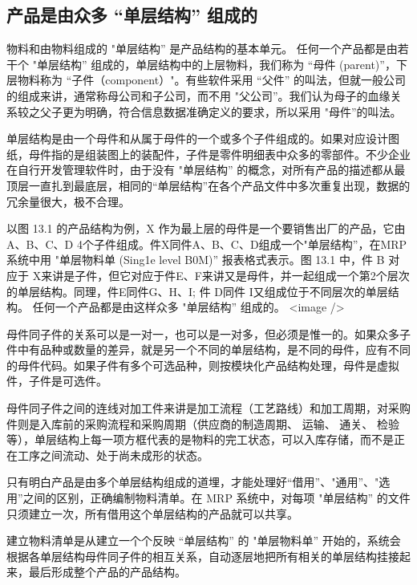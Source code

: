 \subsection {产品是由众多 “单层结构” 组成的}

    物料和由物料组成的 "单层结构” 是产品结构的基本单元。
    任何一个产品都是由若干个 "单层结构” 组成的，单层结构中的上层物料，我们称为 “母件 (parent)”，下层物料称为 “子件（component）"。有些软件采用 “父件” 的叫法，但就一般公司的组成来讲，通常称母公司和子公司，而不用 "父公司”。我们认为母子的血缘关系较之父子更为明确，符合信息数据准确定义的要求，所以采用 "母件”的叫法。

    单层结构是由一个母件和从属于母件的一个或多个子件组成的。如果对应设计图纸，母件指的是组装图上的装配件，子件是零件明细表中众多的零部件。不少企业在自行开发管理软件时，由于没有 "单层结构” 的概念，对所有产品的描述都从最顶层一直扎到最底层，相同的“单层结构”在各个产品文件中多次重复出现，数据的冗余量很大，极不合理。

    以图 13.1 的产品结构为例，X 作为最上层的母件是一个要销售出厂的产品，它由A、B、C、D 4个子件组成。件X同件A、B、C、D组成一个"单层结构”，在MRP系统中用 "单层物料单 (Sing1e level B0M)” 报表格式表示。图 13.1 中，件 B 对应于 X来讲是子件，但它对应于件E、F来讲又是母件，并一起组成一个第2个层次的单层结构。同理，件E同件G、H、I; 件 D同件 I又组成位于不同层次的单层结构。 任何一个产品都是由这样众多 "单层结构” 组成的。
<image />

    母件同子件的关系可以是一对一，也可以是一对多，但必须是惟一的。如果众多子件中有品种或数量的差异，就是另一个不同的单层结构，是不同的母件，应有不同的母件代码。如果子件有多个可选品种，则按模块化产品结构处理，母件是虚拟件，子件是可选件。

    母件同子件之间的连线对加工件来讲是加工流程（工艺路线）和加工周期，对采购件则是入库前的采购流程和采购周期（供应商的制造周期、 运输、 通关、 检验等），单层结构上每一项方框代表的是物料的完工状态，可以入库存储，而不是正在工序之间流动、处于尚未成形的状态。

    只有明白产品是由多个单层结构组成的道埋，才能处理好“借用”、"通用”、"选用”之间的区别，正确编制物料清单。在 MRP 系统中，对每项 "单层结构” 的文件只须建立一次，所有借用这个单层结构的产品就可以共享。

    建立物料清单是从建立一个个反映 “单层结构” 的 "单层物料单” 开始的，系统会根据各单层结构母件同子件的相互关系，自动逐层地把所有相关的单层结构挂接起来，最后形成整个产品的产品结构。
